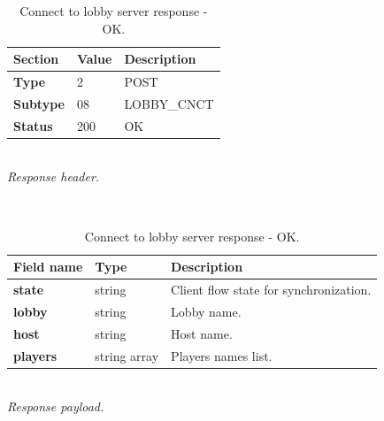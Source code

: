 \documentclass[english, sem, kiv, he, iso690alph, pdf, viewonly]{fasthesis}
\begin{document}
\begin{table}[h!]
	\centering
	\begin{minipage}[b]{1.0\textwidth}
		\centering
		\begin{tabular}{|l|l|l|}
			\hline
			\textbf{Section} & \textbf{Value} & \textbf{Description} \\ \hline
			\textbf{Type} & 2 & \footnotesize{POST} \\ \hline
			\textbf{Subtype} & 08 & \footnotesize{LOBBY\_CNCT}  \\ \hline
			\textbf{Status} & 200 & \footnotesize{OK} \\ \hline
		\end{tabular} \\
		\textit{Response header.}
	\end{minipage} 
	\\
	\vspace{10pt}
	\begin{minipage}[b]{1.0\textwidth}
		\centering
		\begin{tabular}{|l|l|l|}
			\hline
			\textbf{Field name} & \textbf{Type} & \textbf{Description} \\ \hline
			\textbf{state} & string & Client flow state for synchronization. \\ \hline
			\textbf{lobby} & string & Lobby name. \\ \hline
			\textbf{host} & string & Host name. \\ \hline
			\textbf{players} & string array & Players names list. \\ \hline
		\end{tabular} \\
		\textit{Response payload.}
	\end{minipage}	
	\caption{Connect to lobby server response - OK.}
	\label{tab:connect_lobby_response_ok}
\end{table}
\end{document}
